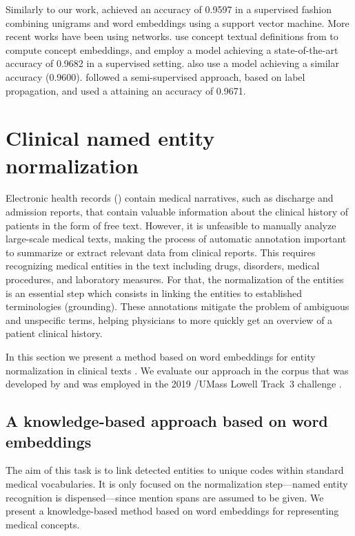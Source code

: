 Similarly to our work, \textcite{jimenoyepes2017a} achieved an accuracy of 0.9597 in a supervised fashion combining unigrams and word embeddings using a support vector machine.
More recent works have been using  networks.
\textcite{pesaranghader2019a} use concept textual definitions from  to compute concept embeddings, and employ a  model achieving a state-of-the-art accuracy of 0.9682 in a supervised setting.
\textcite{zhang2019n} also use a  model achieving a similar accuracy (0.9600).
\textcite{li2019f} followed a semi-supervised approach, based on label propagation, and used a  attaining an accuracy of 0.9671.


\section{Clinical named entity normalization}

Electronic health records () contain medical narratives, such as discharge and admission reports, that contain valuable information about the clinical history of patients in the form of free text.
However, it is unfeasible to manually analyze large-scale medical texts, making the process of automatic annotation important to summarize or extract relevant data from clinical reports.
This requires recognizing medical entities in the text including drugs, disorders, medical procedures, and laboratory measures.
For that, the normalization of the entities is an essential step which consists in linking the entities to established terminologies (grounding).
These annotations mitigate the problem of ambiguous and unspecific terms, helping physicians to  more quickly get an overview of a patient clinical history.

In this section we present a method based on word embeddings for entity normalization in clinical texts \parencite{silva2020a}.
We evaluate our approach in the  corpus that was developed by \textcite{luo2019a} and was employed in the 2019 /UMass Lowell Track~3 challenge \parencite{luo2020b}.


\subsection{A knowledge-based approach based on word embeddings}

The aim of this task is to link detected entities to unique codes within standard medical vocabularies.
It is only focused on the normalization step---named entity recognition is dispensed---since mention spans are assumed to be given.
We present a knowledge-based method based on word embeddings for representing medical concepts.


